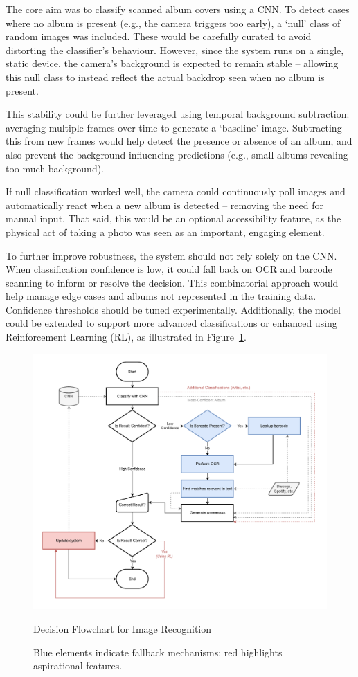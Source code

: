                 The core aim was to classify scanned album covers using a CNN. To detect cases where no album is present (e.g., the camera triggers too early), a ‘null' class of random images was included. These would be carefully curated to avoid distorting the classifier's behaviour. However, since the system runs on a single, static device, the camera's background is expected to remain stable -- allowing this null class to instead reflect the actual backdrop seen when no album is present.
    
                This stability could be further leveraged using temporal background subtraction: averaging multiple frames over time to generate a `baseline' image. Subtracting this from new frames would help detect the presence or absence of an album, and also prevent the background influencing predictions (e.g., small albums revealing too much background).
    
                If null classification worked well, the camera could continuously poll images and automatically react when a new album is detected -- removing the need for manual input. That said, this would be an optional accessibility feature, as the physical act of taking a photo was seen as an important, engaging element.
    
                To further improve robustness, the system should not rely solely on the CNN. When classification confidence is low, it could fall back on OCR and barcode scanning to inform or resolve the decision. This combinatorial approach would help manage edge cases and albums not represented in the training data. Confidence thresholds should be tuned experimentally. Additionally, the model could be extended to support more advanced classifications or enhanced using Reinforcement Learning (RL), as illustrated in Figure~\ref{fig:classifyFlowchart}.
    
                \begin{figure}
                    \centering
                    \includegraphics[width=0.85\linewidth]{images/ClassifyFlowchart.pdf}
                    \caption{Decision Flowchart for Image Recognition}
                    \label{fig:classifyFlowchart}
                    \caption*{Blue elements indicate fallback mechanisms; red highlights aspirational features.}
                \end{figure}
        
